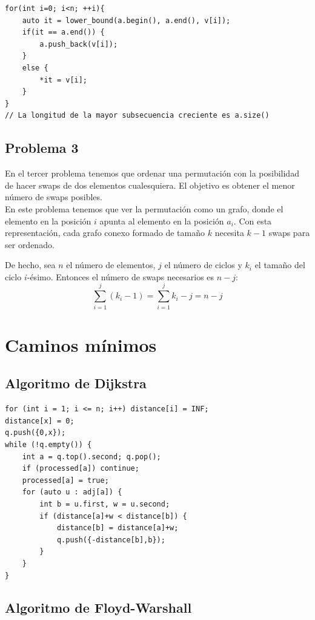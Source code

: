 \documentclass[11 pt]{article}
\begin{document}
\begin{verbatim}
for(int i=0; i<n; ++i){
    auto it = lower_bound(a.begin(), a.end(), v[i]);
    if(it == a.end()) {
        a.push_back(v[i]);
    }
    else {
        *it = v[i];
    }
}
// La longitud de la mayor subsecuencia creciente es a.size()
\end{verbatim}

\subsection{Problema 3}
En el tercer problema tenemos que ordenar una permutación con la posibilidad de hacer swaps de dos elementos cualesquiera. El objetivo es obtener el menor número de swaps posibles.\\
En este problema tenemos que ver la permutación como un grafo, donde el elemento en la posición $i$ apunta al elemento en la posición $a_i$. Con esta representación, cada grafo conexo formado de tamaño $k$ necesita $k-1$ swaps para ser ordenado.


De hecho, sea $n$ el número de elementos, $j$ el número de ciclos y $k_i$ el tamaño del ciclo $i$-ésimo.
Entonces el número de swaps necesarios es $n-j$:
\[ \sum_{i=1}^{j} \left( k_i - 1 \right) = \sum_{i=1}^{j} k_i - j = n - j \]

\vspace{25 px}
\section{Caminos mínimos}
\subsection{Algoritmo de Dijkstra}

\begin{verbatim}
for (int i = 1; i <= n; i++) distance[i] = INF;
distance[x] = 0;
q.push({0,x});
while (!q.empty()) {
    int a = q.top().second; q.pop();
    if (processed[a]) continue;
    processed[a] = true;
    for (auto u : adj[a]) {
        int b = u.first, w = u.second;
        if (distance[a]+w < distance[b]) {
            distance[b] = distance[a]+w;
            q.push({-distance[b],b});
        }
    }
}
\end{verbatim}


\subsection{Algoritmo de Floyd-Warshall}
\end{document}
